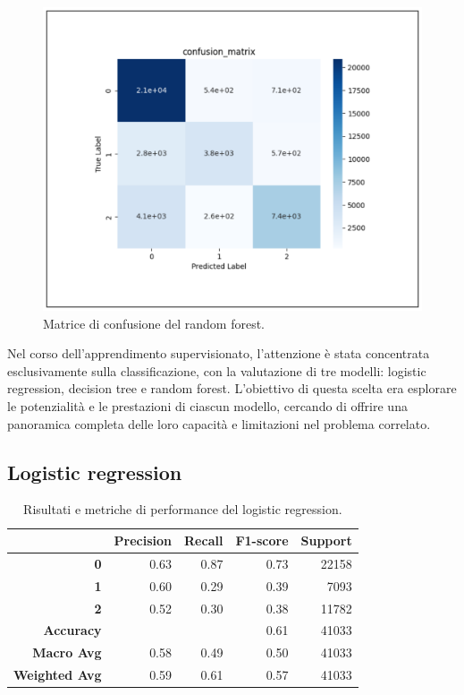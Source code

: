 \begin{figure}[t]
\begin{multicols}{3}
        \includegraphics[width=\linewidth]{img//6/5.png}
        \caption{Matrice di confusione del random forest.}
        \label{fig:6-5}
    \end{multicols}
\end{figure}

Nel corso dell'apprendimento supervisionato, l'attenzione è stata concentrata esclusivamente sulla classificazione, con la valutazione di tre modelli: logistic regression, decision tree e random forest. L'obiettivo di questa scelta era esplorare le potenzialità e le prestazioni di ciascun modello, cercando di offrire una panoramica completa delle loro capacità e limitazioni nel problema correlato.

\subsection{Logistic regression}

\begin{table}[t]
    \centering
    \begin{tabular}{|r|rrrr|}
        \hline
        & \textbf{Precision}
        & \textbf{Recall}
        & \textbf{F1-score}
        & \textbf{Support} \\
        \hline
        \textbf{0}
        & 0.63
        & 0.87
        & 0.73
        & 22158 \\
        \textbf{1}
        & 0.60
        & 0.29
        & 0.39
        & 7093 \\
        \textbf{2}
        & 0.52
        & 0.30
        & 0.38
        & 11782 \\
        \textbf{Accuracy}
        &
        &
        & 0.61
        & 41033 \\
        \textbf{Macro Avg}
        & 0.58
        & 0.49
        & 0.50
        & 41033 \\
        \textbf{Weighted Avg}
        & 0.59
        & 0.61
        & 0.57
        & 41033 \\
        \hline
    \end{tabular}
    \caption{Risultati e metriche di performance del logistic regression.}
    \label{tab:6-2}
\end{table}

